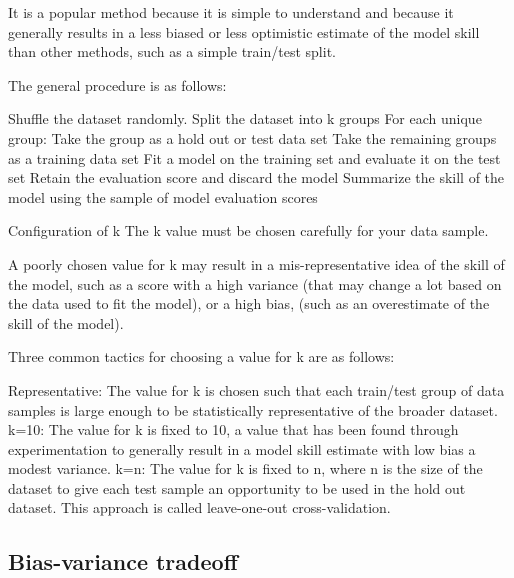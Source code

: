 It is a popular method because it is simple to understand and because it generally results in a less biased or less optimistic estimate of the model skill than other methods, such as a simple train/test split.

The general procedure is as follows:

Shuffle the dataset randomly.
Split the dataset into k groups
For each unique group:
Take the group as a hold out or test data set
Take the remaining groups as a training data set
Fit a model on the training set and evaluate it on the test set
Retain the evaluation score and discard the model
Summarize the skill of the model using the sample of model evaluation scores



Configuration of k
The k value must be chosen carefully for your data sample.

A poorly chosen value for k may result in a mis-representative idea of the skill of the model, such as a score with a high variance (that may change a lot based on the data used to fit the model), or a high bias, (such as an overestimate of the skill of the model).

Three common tactics for choosing a value for k are as follows:

Representative: The value for k is chosen such that each train/test group of data samples is large enough to be statistically representative of the broader dataset.
k=10: The value for k is fixed to 10, a value that has been found through experimentation to generally result in a model skill estimate with low bias a modest variance.
k=n: The value for k is fixed to n, where n is the size of the dataset to give each test sample an opportunity to be used in the hold out dataset. This approach is called leave-one-out cross-validation.

\subsection{Bias-variance tradeoff}
